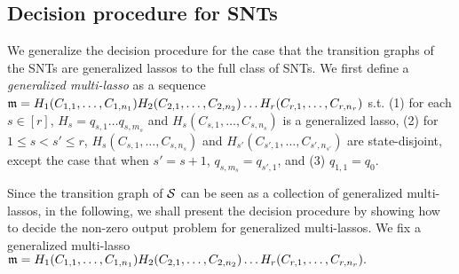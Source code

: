 \subsection{Decision procedure for SNTs}\label{sec-gflat}

We generalize the decision procedure for the case that the transition graphs of the SNTs are generalized lassos to the full class of SNTs.
We first define a \emph{generalized multi-lasso} as a sequence $\mathfrak{m}= H_1 (C_{1,1},\dots,C_{1,n_1}) H_2 (C_{2,1},\dots,C_{2,n_2}) \dots H_r (C_{r,1},\dots, C_{r, n_r})$ s.t. (1) for each $s\in[r]$, $H_s = q_{s,1} \dots q_{s, m_s}$ and $H_s (C_{s,1},\dots,C_{s, n_s})$ is a generalized lasso, (2) for $1 \leq s< s' \leq r$, $H_s (C_{s,1},\dots,C_{s, n_s})$ and $H_{s'} (C_{s', 1},\dots,C_{s', n_{s'}})$ are state-disjoint, except the case that when $s'=s+1$, $q_{s, m_s}=q_{s',1}$, and (3) $q_{1,1}=q_0$.

Since the transition graph of ${\mathcal{S} }$ can be seen as a collection of generalized multi-lassos, in the following, we shall present the decision procedure by showing how to decide the non-zero output problem for generalized multi-lassos. We fix a generalized multi-lasso
$\mathfrak{m}= H_1 (C_{1,1},\dots,C_{1,n_1}) H_2 (C_{2,1},\dots,C_{2,n_2}) \dots H_r (C_{r,1},\dots, C_{r, n_r}).$

